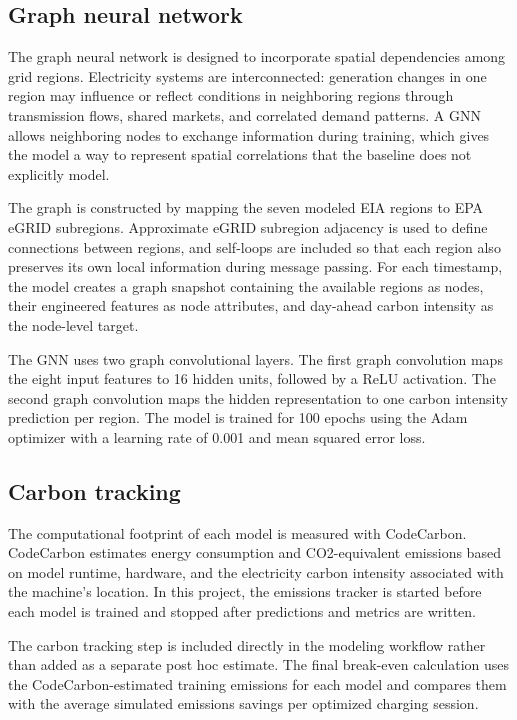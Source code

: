 \documentclass{article}
\begin{document}
\subsection{Graph neural network}

The graph neural network is designed to incorporate spatial dependencies among grid regions. Electricity systems are interconnected: generation changes in one region may influence or reflect conditions in neighboring regions through transmission flows, shared markets, and correlated demand patterns. A GNN allows neighboring nodes to exchange information during training, which gives the model a way to represent spatial correlations that the baseline does not explicitly model.

The graph is constructed by mapping the seven modeled EIA regions to EPA eGRID subregions. Approximate eGRID subregion adjacency is used to define connections between regions, and self-loops are included so that each region also preserves its own local information during message passing. For each timestamp, the model creates a graph snapshot containing the available regions as nodes, their engineered features as node attributes, and day-ahead carbon intensity as the node-level target.

The GNN uses two graph convolutional layers. The first graph convolution maps the eight input features to 16 hidden units, followed by a ReLU activation. The second graph convolution maps the hidden representation to one carbon intensity prediction per region. The model is trained for 100 epochs using the Adam optimizer with a learning rate of 0.001 and mean squared error loss.

\subsection{Carbon tracking}

The computational footprint of each model is measured with CodeCarbon. CodeCarbon estimates energy consumption and CO2-equivalent emissions based on model runtime, hardware, and the electricity carbon intensity associated with the machine's location. In this project, the emissions tracker is started before each model is trained and stopped after predictions and metrics are written. 

The carbon tracking step is included directly in the modeling workflow rather than added as a separate post hoc estimate. The final break-even calculation uses the CodeCarbon-estimated training emissions for each model and compares them with the average simulated emissions savings per optimized charging session.
\end{document}

